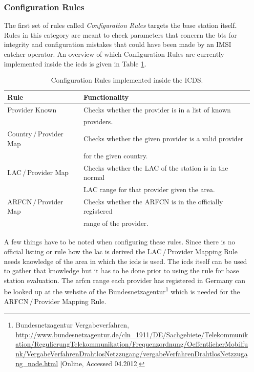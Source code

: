 \subsubsection{Configuration Rules}
The first set of rules called \emph{Configuration Rules} targets the base station itself.
Rules in this category are meant to check parameters that concern the \gls{bts} for integrity and configuration mistakes that could have been made by an IMSI catcher operator.
An overview of which Configuration Rules are currently implemented inside the \gls{icds} is given in Table \ref{tab:config_rules}.
\begin{table}
\centering
\begin{tabular}{ll}
\toprule
Rule					&Functionality\\
\midrule
Provider Known			&Checks whether the provider is in a list of known \\
						&providers.\\
Country\,/\,Provider Map	&Checks whether the given provider is a valid provider\\
						&for the given country.\\
LAC\,/\,Provider Map		&Checks whether the LAC of the station is in the normal\\
						&LAC range for that provider given the area.\\
ARFCN\,/\,Provider Map		&Checks whether the ARFCN is in the officially registered\\
						&range of the provider.\\
\bottomrule
\end{tabular}
\caption{Configuration Rules implemented inside the ICDS.}
\label{tab:config_rules}
\end{table}

A few things have to be noted when configuring these rules.
Since there is no official listing or rule how the \gls{lac} is derived the LAC\,/\,Provider Mapping Rule needs knowledge of the area in which the \gls{icds} is used.
The \gls{icds} itself can be used to gather that knowledge but it has to be done prior to using the rule for base station evaluation. 
The \gls{arfcn} range each provider has registered in Germany can be looked up at the website of the Bundesnetzagentur\footnote{Bundesnetzagentur Vergabeverfahren, \url{http://www.bundesnetzagentur.de/cln_1911/DE/Sachgebiete/Telekommunikation/RegulierungTelekommunikation/Frequenzordnung/OeffentlicherMobilfunk/VergabeVerfahrenDrahtlosNetzzugang/vergabeVerfahrenDrahtlosNetzzugang_node.html} [Online, Accessed 04.2012]} which is needed for the ARFCN\,/\,Provider Mapping Rule.

